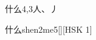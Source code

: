 \begin{entry}{什么}{4,3}{⼈、⼃}
  \begin{phonetics}{什么}{shen2me5}[][HSK 1]
  \end{phonetics}
\end{entry}
